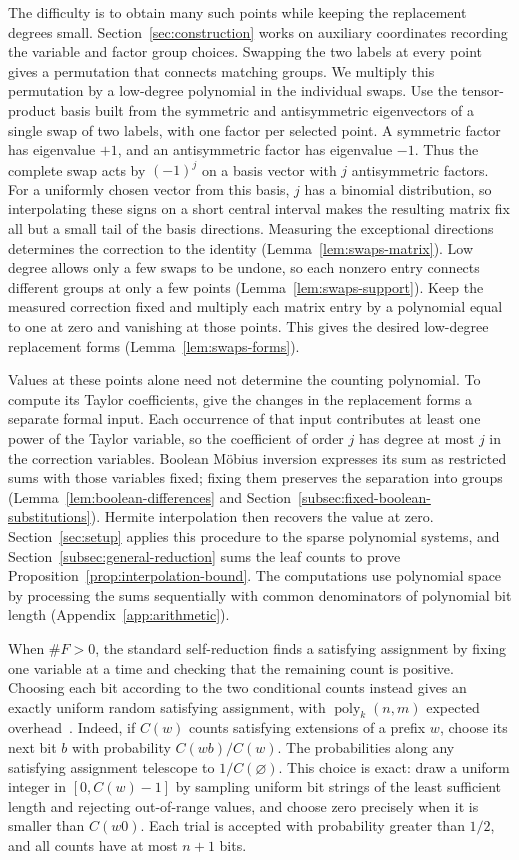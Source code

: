 \documentclass[11pt,reqno]{amsart}
\numberwithin{equation}{section}
\theoremstyle{definition}\newtheorem{definition}[theorem]{Definition}
\theoremstyle{remark}\newtheorem{remark}[theorem]{Remark}
\newcommand{\poly}{\operatorname{poly}}
\begin{document}
The difficulty is to obtain many such points while keeping the
replacement degrees small. Section~\ref{sec:construction} works on
auxiliary coordinates recording the variable and factor group choices.
Swapping the two labels at every point gives a permutation that
connects matching groups. We multiply this permutation by a
low-degree polynomial in the individual swaps. Use the tensor-product basis built from the symmetric and
antisymmetric eigenvectors of a single swap of two labels, with one
factor per selected point. A symmetric factor has eigenvalue $+1$,
and an antisymmetric factor has eigenvalue $-1$. Thus the complete
swap acts by $(-1)^j$ on a basis vector with $j$ antisymmetric factors.
For a uniformly chosen vector from this basis, $j$ has a binomial
distribution, so interpolating these signs on a short central
interval makes the resulting matrix fix all but a small tail of the
basis directions.
Measuring the exceptional directions determines the correction to the identity
(Lemma~\ref{lem:swaps-matrix}). Low degree allows only a few swaps
to be undone, so each nonzero entry connects different groups at only
a few points (Lemma~\ref{lem:swaps-support}). Keep the measured
correction fixed and multiply each matrix entry by a polynomial
equal to one at zero and vanishing at those points. This gives the
desired low-degree replacement forms (Lemma~\ref{lem:swaps-forms}).

Values at these points alone need not determine the counting
polynomial. To compute its Taylor coefficients, give the changes
in the replacement forms a separate formal input. Each occurrence
of that input contributes at least one power of the Taylor variable,
so the coefficient of order $j$ has degree at most $j$ in the
correction variables. Boolean M\"obius inversion expresses its sum
as restricted sums with those variables fixed; fixing them preserves
the separation into groups (Lemma~\ref{lem:boolean-differences} and
Section~\ref{subsec:fixed-boolean-substitutions}). Hermite
interpolation then recovers the value at zero. Section~\ref{sec:setup}
applies this procedure to the sparse polynomial systems, and
Section~\ref{subsec:general-reduction} sums the leaf counts to prove
Proposition~\ref{prop:interpolation-bound}. The computations use
polynomial space by processing the sums sequentially with common
denominators of polynomial bit length (Appendix~\ref{app:arithmetic}).

When $\#F>0$, the standard self-reduction finds a satisfying
assignment by fixing one variable at a time and checking that the
remaining count is positive. Choosing each bit according to the two
conditional counts instead gives an exactly uniform random satisfying
assignment, with $\poly_k(n,m)$ expected overhead~\cite[Theorem~3.3(1)]{JVV86}.
Indeed, if $C(w)$ counts satisfying extensions of a prefix $w$,
choose its next bit $b$ with probability $C(wb)/C(w)$.
The probabilities along any satisfying assignment telescope to
$1/C(\varnothing)$. This choice is exact: draw a uniform integer
in $[0,C(w)-1]$ by sampling uniform bit strings of the least sufficient length and rejecting out-of-range values, and choose zero
precisely when it is smaller than $C(w0)$. Each trial is accepted
with probability greater than $1/2$, and all counts have at most
$n+1$ bits.
\end{document}
